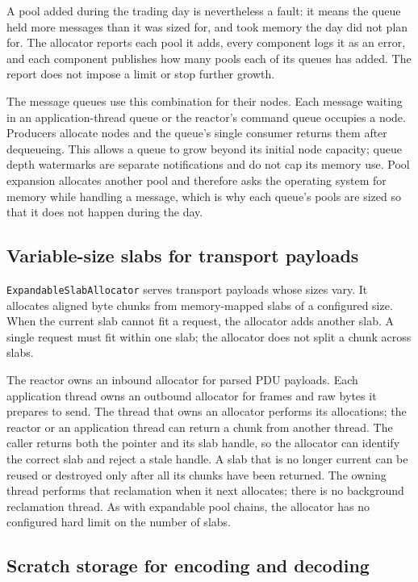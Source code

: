 A pool added during the trading day is nevertheless a fault: it means the queue
held more messages than it was sized for, and took memory the day did not plan
for. The allocator reports each pool it adds, every component logs it as an
error, and each component publishes how many pools each of its queues has
added. The report does not impose a limit or stop further growth.

The message queues use this combination for their nodes. Each message waiting
in an application-thread queue or the reactor's command queue occupies a node.
Producers allocate nodes and the queue's single consumer returns them after
dequeueing. This allows a queue to grow beyond its initial node capacity; queue
depth watermarks are separate notifications and do not cap its memory use.
Pool expansion allocates another pool and therefore asks the operating system
for memory while handling a message, which is why each queue's pools are sized
so that it does not happen during the day.

\subsection{Variable-size slabs for transport payloads}

\texttt{ExpandableSlabAllocator} serves transport payloads whose sizes vary.
It allocates aligned byte chunks from memory-mapped slabs of a configured
size. When the current slab cannot fit a request, the allocator adds another
slab. A single request must fit within one slab; the allocator does not split a
chunk across slabs.

The reactor owns an inbound allocator for parsed PDU payloads. Each
application thread owns an outbound allocator for frames and raw bytes it
prepares to send. The thread that owns an allocator performs its allocations;
the reactor or an application thread can return a chunk from another thread.
The caller returns both the pointer and its slab handle, so the allocator can
identify the correct slab and reject a stale handle. A slab that is no longer
current can be reused or destroyed only after all its chunks have been
returned. The owning thread performs that reclamation when it next allocates;
there is no background reclamation thread. As with expandable pool chains,
the allocator has no configured hard limit on the number of slabs.

\subsection{Scratch storage for encoding and decoding}

